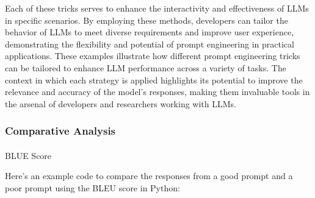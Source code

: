 \documentclass[
]{agujournal2019}
\makeatletter
\let\oldparagraph\paragraph
\renewcommand{\paragraph}{
    \@ifstar
      \xxxParagraphStar
      \xxxParagraphNoStar
  }
\newcommand{\xxxParagraphStar}[1]{\oldparagraph*{#1}\mbox{}}
\newcommand{\xxxParagraphNoStar}[1]{\oldparagraph{#1}\mbox{}}
\makeatother
\begin{document}
Each of these tricks serves to enhance the interactivity and
effectiveness of LLMs in specific scenarios. By employing these methods,
developers can tailor the behavior of LLMs to meet diverse requirements
and improve user experience, demonstrating the flexibility and potential
of prompt engineering in practical applications. These examples
illustrate how different prompt engineering tricks can be tailored to
enhance LLM performance across a variety of tasks. The context in which
each strategy is applied highlights its potential to improve the
relevance and accuracy of the model's responses, making them invaluable
tools in the arsenal of developers and researchers working with LLMs.

\subsubsection{Comparative Analysis}\label{comparative-analysis}

\paragraph{BLUE Score}\label{blue-score}

Here's an example code to compare the responses from a good prompt and a
poor prompt using the BLEU score in Python:
\end{document}
